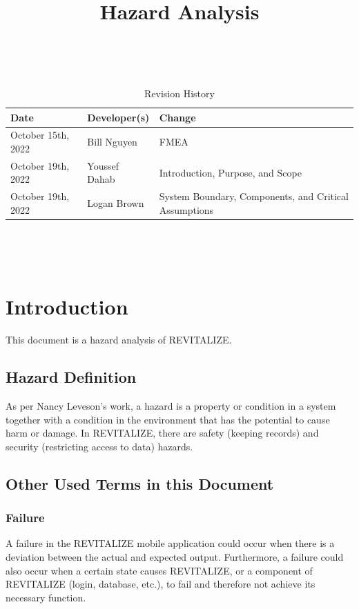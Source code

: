 \documentclass{article}
\title{Hazard Analysis\\\progname}
\author{\authname}
\date{}
\begin{document}
\maketitle
\thispagestyle{empty}

~\newpage


\begin{table}[hp]
	\caption{Revision History} \label{TblRevisionHistory}
	\begin{tabularx}{\textwidth}{llX}
		\toprule
		\textbf{Date} & \textbf{Developer(s)} & \textbf{Change}\\
		\midrule
		October 15th, 2022 & Bill Nguyen & FMEA \\
		October 19th, 2022 & Youssef Dahab & Introduction, Purpose, and Scope \\
        October 19th, 2022 & Logan Brown & System Boundary, Components, and Critical Assumptions\\
		\bottomrule
	\end{tabularx}
\end{table}

~\newpage

\tableofcontents

~\newpage


\section{Introduction}
This document is a hazard analysis of REVITALIZE.

\subsection{Hazard Definition}
As per Nancy Leveson's work, a hazard is a property or condition in a system together with a condition in the environment that has the potential to cause harm or damage. In REVITALIZE, there are safety (keeping records) and security (restricting access to data) hazards.

\subsection{Other Used Terms in this Document}

\subsubsection{Failure}
A failure in the REVITALIZE mobile application could occur when there is a deviation between the actual and expected output. Furthermore, a failure could also occur when a certain state causes REVITALIZE, or a component of REVITALIZE (login, database, etc.), to fail and therefore not achieve its necessary function.
\end{document}
